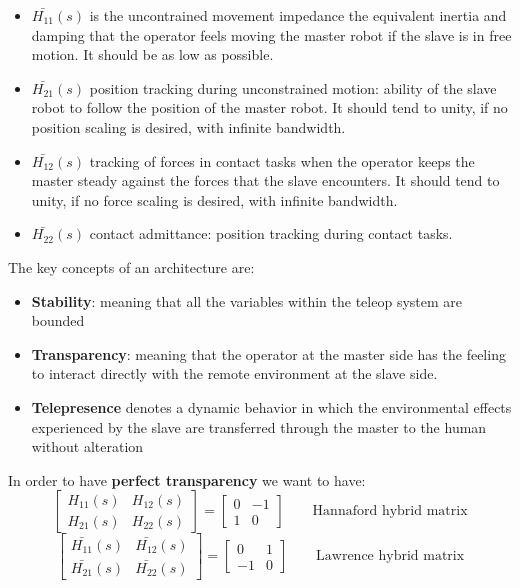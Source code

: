 \documentclass[a4paper,12pt]{article}
\begin{document}
\begin{itemize}
    \item $\bar{H_{11}}(s)$ is the uncontrained movement impedance the equivalent inertia and damping that the operator feels moving the master robot if the slave is in free motion. It should be as low as possible. 
    \item $\bar{H_{21}}(s)$ position tracking during unconstrained motion: ability of the slave robot to follow the position of the master robot. It should tend to unity, if no position scaling is desired, with infinite bandwidth. 
    \item $\bar{H_{12}}(s)$ tracking of forces in contact tasks when the operator keeps the master steady against the forces that the slave encounters. It should tend to unity, if no force scaling is desired, with infinite bandwidth.
    \item $\bar{H_{22}}(s)$ contact admittance: position tracking during contact tasks.
\end{itemize}

\bigskip
The key concepts of an architecture are:
\bigskip
\begin{itemize}
    \item \textbf{Stability}: meaning that all the variables within the teleop system are bounded
    \item \textbf{Transparency}: meaning that the operator at the master side has the feeling to interact directly with the remote environment at the slave side.
    \item \textbf{Telepresence} denotes a dynamic behavior in which the environmental effects experienced by the slave are transferred through the master to the human without alteration
\end{itemize}

\bigskip 
\noindent In order to have \textbf{perfect transparency} we want to have:
\[
    \begin{bmatrix}
        H_{11}(s) & H_{12}(s) \\ H_{21}(s) & H_{22}(s)
    \end{bmatrix} = \begin{bmatrix}
        0 & -1 \\ 1 & 0
    \end{bmatrix} \qquad \text{Hannaford hybrid matrix}
\]
\[
    \begin{bmatrix}
        \bar{H_{11}}(s) & \bar{H_{12}}(s) \\ \bar{H_{21}}(s) &\bar{ H_{22}}(s)
    \end{bmatrix} = \begin{bmatrix}
        0 & 1 \\ -1 & 0
    \end{bmatrix} \qquad \text{Lawrence hybrid matrix}
\]
\end{document}
